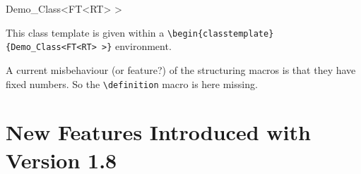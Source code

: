 \begin{classtemplate}{Demo_Class<FT<RT> >}

This class template is given within a
\verb"\begin{classtemplate}{Demo_Class<FT<RT> >}" environment.

\creation

A current misbehaviour (or feature?) of the structuring macros is that
they have fixed numbers. So the \verb"\definition" macro is here
missing.




\operations
\threecolumns{4.3cm}{2.3cm}



\end{classtemplate}

\section{New Features Introduced with Version 1.8}

